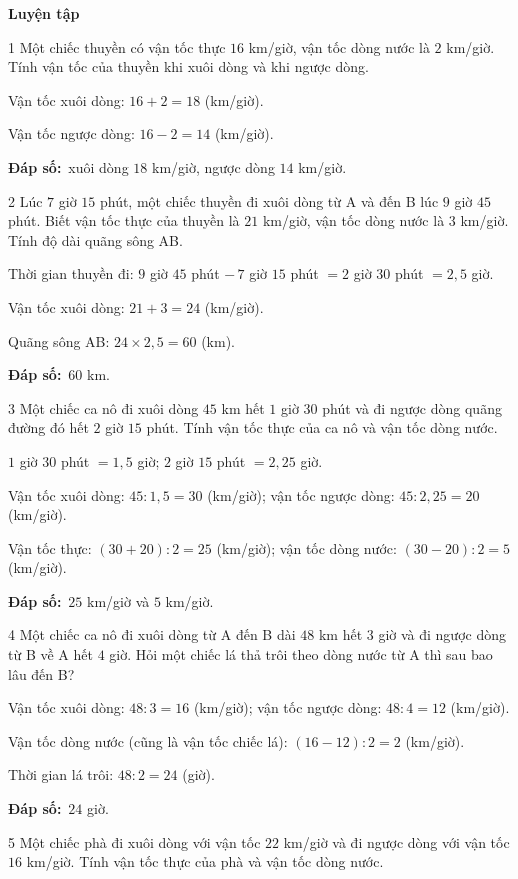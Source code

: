\documentclass[11pt]{article}
\newif\ifsol \solfalse
\providecommand{\AnsWord}{Đáp số}
\newcommand{\dapso}[1]{\par\textbf{\AnsWord:}\ #1}
\newcommand{\probsol}[1]{%
  \begin{lrbox}{\solmeasure}\begin{minipage}{\dimexpr\linewidth-24pt\relax}#1\end{minipage}\end{lrbox}%
  \ifsol
    \begin{solbox}#1\end{solbox}%
  \else
    \setlength{\solht}{\dimexpr\ht\solmeasure+\dp\solmeasure+0.85cm\relax}%
    \ifdim\solht<1.35cm\setlength{\solht}{1.35cm}\fi
    \begin{tcolorbox}[colback=white,colframe=Line,boxrule=0.8pt,arc=5pt,
      left=8pt,right=8pt,top=4pt,bottom=4pt,height=\solht]{\footnotesize\color{Slate}\itshape\WorkWord}\end{tcolorbox}%
  \fi}
\newcommand{\dividerbar}[1]{\par\vspace{0.6em}\noindent
  \begin{tcolorbox}[enhanced,frame hidden,interior hidden,borderline west={5pt}{0pt}{ProbBlue},
    colback=white,left=12pt,right=12pt,top=5pt,bottom=5pt,arc=4pt]
  {\large\bfseries\color{ProbBlue} #1}\end{tcolorbox}\vspace{0.4em}}
\newcommand{\gap}{\vspace{0.3cm}}
\def\WorkWord{Bài làm:}
\def\AnsWord{Đáp số}
\begin{document}
\dividerbar{Luyện tập}
\begin{probbox}{1}{\relax}
Một chiếc thuyền có vận tốc thực $16$ km/giờ, vận tốc dòng nước là $2$ km/giờ. Tính vận tốc của thuyền khi xuôi dòng và khi ngược dòng.
\end{probbox}
\probsol{
Vận tốc xuôi dòng: $16+2=18$ (km/giờ).\par Vận tốc ngược dòng: $16-2=14$ (km/giờ).
\dapso{xuôi dòng $18$ km/giờ, ngược dòng $14$ km/giờ.}}
\gap
\begin{probbox}{2}{\relax}
Lúc $7$ giờ $15$ phút, một chiếc thuyền đi xuôi dòng từ A và đến B lúc $9$ giờ $45$ phút. Biết vận tốc thực của thuyền là $21$ km/giờ, vận tốc dòng nước là $3$ km/giờ. Tính độ dài quãng sông AB.
\end{probbox}
\probsol{
Thời gian thuyền đi: $9$ giờ $45$ phút $-\,7$ giờ $15$ phút $=2$ giờ $30$ phút $=2{,}5$ giờ.\par
Vận tốc xuôi dòng: $21+3=24$ (km/giờ).\par Quãng sông AB: $24\times2{,}5=60$ (km).
\dapso{$60$ km.}}
\gap
\begin{probbox}{3}{\relax}
Một chiếc ca nô đi xuôi dòng $45$ km hết $1$ giờ $30$ phút và đi ngược dòng quãng đường đó hết $2$ giờ $15$ phút. Tính vận tốc thực của ca nô và vận tốc dòng nước.
\end{probbox}
\probsol{
$1$ giờ $30$ phút $=1{,}5$ giờ; $2$ giờ $15$ phút $=2{,}25$ giờ.\par
Vận tốc xuôi dòng: $45:1{,}5=30$ (km/giờ); vận tốc ngược dòng: $45:2{,}25=20$ (km/giờ).\par
Vận tốc thực: $(30+20):2=25$ (km/giờ); vận tốc dòng nước: $(30-20):2=5$ (km/giờ).
\dapso{$25$ km/giờ và $5$ km/giờ.}}
\gap
\begin{probbox}{4}{\relax}
Một chiếc ca nô đi xuôi dòng từ A đến B dài $48$ km hết $3$ giờ và đi ngược dòng từ B về A hết $4$ giờ. Hỏi một chiếc lá thả trôi theo dòng nước từ A thì sau bao lâu đến B?
\end{probbox}
\probsol{
Vận tốc xuôi dòng: $48:3=16$ (km/giờ); vận tốc ngược dòng: $48:4=12$ (km/giờ).\par
Vận tốc dòng nước (cũng là vận tốc chiếc lá): $(16-12):2=2$ (km/giờ).\par Thời gian lá trôi: $48:2=24$ (giờ).
\dapso{$24$ giờ.}}
\gap
\begin{probbox}{5}{\relax}
Một chiếc phà đi xuôi dòng với vận tốc $22$ km/giờ và đi ngược dòng với vận tốc $16$ km/giờ. Tính vận tốc thực của phà và vận tốc dòng nước.
\end{probbox}
\end{document}
